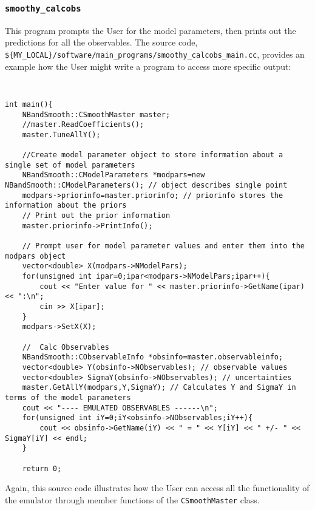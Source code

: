 \documentclass[UserManual.tex]{subfiles}
\begin{document}
\subsubsection{{\tt smoothy\_calcobs}}
This program prompts the User for the model parameters, then prints out the predictions for all the observables. The source code, {\tt \$\{MY\_LOCAL\}/software/main\_programs/smoothy\_calcobs\_main.cc}, provides an example how the User might write a program to access more specific output:
{\tt
\begin{verbatim}
int main(){
	NBandSmooth::CSmoothMaster master;
	//master.ReadCoefficients();
	master.TuneAllY();
	
	//Create model parameter object to store information about a single set of model parameters
	NBandSmooth::CModelParameters *modpars=new NBandSmooth::CModelParameters(); // object describes single point
	modpars->priorinfo=master.priorinfo; // priorinfo stores the information about the priors
	// Print out the prior information
	master.priorinfo->PrintInfo();
	
	// Prompt user for model parameter values and enter them into the modpars object
	vector<double> X(modpars->NModelPars);
	for(unsigned int ipar=0;ipar<modpars->NModelPars;ipar++){
		cout << "Enter value for " << master.priorinfo->GetName(ipar) << ":\n";
		cin >> X[ipar];
	}
	modpars->SetX(X);
	
	//  Calc Observables
	NBandSmooth::CObservableInfo *obsinfo=master.observableinfo;
	vector<double> Y(obsinfo->NObservables); // observable values
	vector<double> SigmaY(obsinfo->NObservables); // uncertainties
	master.GetAllY(modpars,Y,SigmaY); // Calculates Y and SigmaY in terms of the model parameters
	cout << "---- EMULATED OBSERVABLES ------\n";
	for(unsigned int iY=0;iY<obsinfo->NObservables;iY++){
		cout << obsinfo->GetName(iY) << " = " << Y[iY] << " +/- " << SigmaY[iY] << endl;
	}

	return 0;
\end{verbatim}}
Again, this source code illustrates how the User can access all the functionality of the emulator through member functions of the {\tt CSmoothMaster} class.
\end{document}
